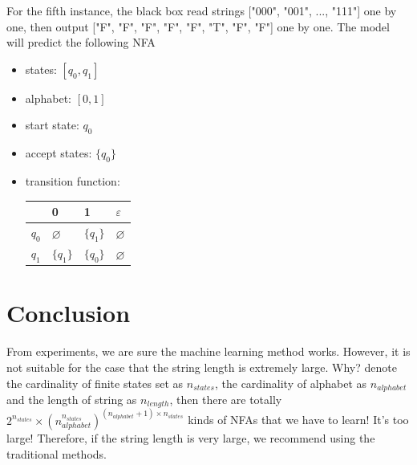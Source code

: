 \documentclass{article}
\begin{document}
For the fifth instance, the black box read strings ["000", "001", ..., "111"] one by one, then output ["F", "F", "F", "F", "F", "T", "F", "F"] one by one. The model will predict the following NFA
\begin{itemize}
    \item states: $[q_0, q_1]$
    \item alphabet: $[0, 1]$
    \item start state: $q_0$
    \item accept states: $\{ q_0 \}$
    \item transition function: 
    \begin{tabular}{l|lll}
              & 0             & 1             & $\varepsilon$ \\ \hline
        $q_0$ & $\varnothing$ & $\{ q_1 \}$   & $\varnothing$ \\   
        $q_1$ & $\{ q_1 \}$   & $\{ q_0 \}$   & $\varnothing$ \\  
    \end{tabular}
\end{itemize}


\section{Conclusion}
From experiments, we are sure the machine learning method works. However, it is not suitable for the case that the string length is extremely large. Why? denote the cardinality of finite states set as $n_{states}$, the cardinality of alphabet as $n_{alphabet}$ and the length of string as $n_{length}$, then there are totally $2^{n_{states}} \times (n_{alphabet}^{n_{states}})^{(n_{alphabet} + 1) \times n_{states}}$ kinds of NFAs that we have to learn! It's too large! Therefore, if the string length is very large, we recommend using the traditional methods.



  
 
\end{document}
